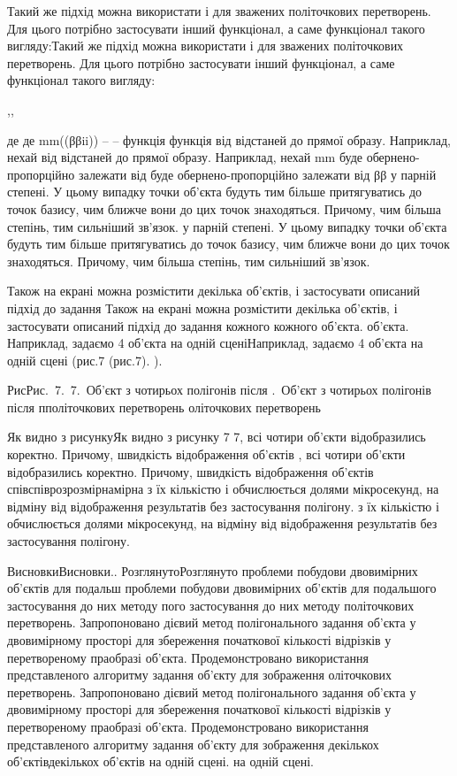 \documentclass[12pt,a4paper]{article}
\begin{document}
\par
Такий же підхід можна використати і для зважених політочкових перетворень. Для цього потрібно застосувати інший функціонал, а саме функціонал такого вигляду:Такий же підхід можна використати і для зважених політочкових перетворень. Для цього потрібно застосувати інший функціонал, а саме функціонал такого вигляду:
\par
,,
\par
де де mm((ββii)) –  – функція функція від відстаней до прямої образу. Наприклад, нехай від відстаней до прямої образу. Наприклад, нехай mm буде обернено-пропорційно залежати від  буде обернено-пропорційно залежати від ββ у парній степені. У цьому випадку точки об’єкта будуть тим більше притягуватись до точок базису, чим ближче вони до цих точок знаходяться. Причому, чим більша степінь, тим сильніший зв'язок.  у парній степені. У цьому випадку точки об’єкта будуть тим більше притягуватись до точок базису, чим ближче вони до цих точок знаходяться. Причому, чим більша степінь, тим сильніший зв'язок.
\par
Також на екрані можна розмістити декілька об’єктів, і застосувати описаний підхід до задання Також на екрані можна розмістити декілька об’єктів, і застосувати описаний підхід до задання кожного кожного об’єкта. об’єкта. Наприклад, задаємо 4 об’єкта на одній сценіНаприклад, задаємо 4 об’єкта на одній сцені (рис.7 (рис.7). ).
\par
РисРис. 7. 7. Об’єкт з чотирьох полігонів після . Об’єкт з чотирьох полігонів після пполіточкових перетворень оліточкових перетворень
\par
Як видно з рисункуЯк видно з рисунку 7 7, всі чотири об’єкти відобразились коректно. Причому, швидкість відображення об’єктів , всі чотири об’єкти відобразились коректно. Причому, швидкість відображення об’єктів співспіврозрозмірнамірна з їх кількістю і обчислюється долями мікросекунд, на відміну від відображення результатів без застосування полігону.  з їх кількістю і обчислюється долями мікросекунд, на відміну від відображення результатів без застосування полігону.
\par
ВисновкиВисновки..  РозглянутоРозглянуто проблеми побудови двовимірних об’єктів для подальш проблеми побудови двовимірних об’єктів для подальшого застосування до них методу пого застосування до них методу політочкових перетворень. Запропоновано дієвий метод полігонального задання об’єкта у двовимірному просторі для збереження початкової кількості відрізків у перетвореному праобразі об’єкта. Продемонстровано використання представленого алгоритму задання об’єкту для зображення оліточкових перетворень. Запропоновано дієвий метод полігонального задання об’єкта у двовимірному просторі для збереження початкової кількості відрізків у перетвореному праобразі об’єкта. Продемонстровано використання представленого алгоритму задання об’єкту для зображення декількох об’єктівдекількох об’єктів на одній сцені. на одній сцені.
\end{document}
